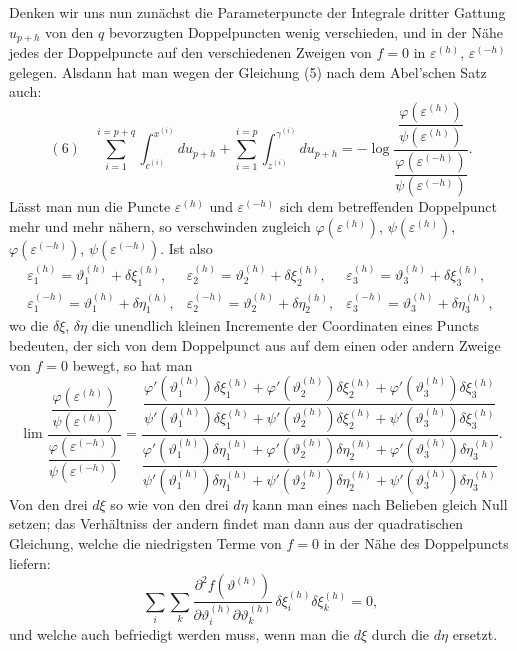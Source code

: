 \documentclass[10pt]{article}
\begin{document}
Denken wir uns nun zunächst die Parameterpuncte der Integrale dritter Gattung \(u_{p+h}\) von den \(q\) bevorzugten Doppelpuncten wenig verschieden, und in der Nähe jedes der Doppelpuncte auf den verschiedenen Zweigen von \(f=0\) in \(\varepsilon^{(h)}\), \(\varepsilon^{(-h)}\) gelegen. Alsdann hat man wegen der Gleichung (5) nach dem Abel'schen Satz auch:
\[
(6)\quad
\sum_{i=1}^{i=p+q}\int_{c^{(i)}}^{x^{(i)}}du_{p+h}
+\sum_{i=1}^{i=p}\int_{z^{(i)}}^{\gamma^{(i)}}du_{p+h}
=-\log
\frac{\dfrac{\varphi(\varepsilon^{(h)})}{\psi(\varepsilon^{(h)})}}
{\dfrac{\varphi(\varepsilon^{(-h)})}{\psi(\varepsilon^{(-h)})}}.
\]
Lässt man nun die Puncte \(\varepsilon^{(h)}\) und \(\varepsilon^{(-h)}\) sich dem betreffenden Doppelpunct mehr und mehr nähern, so verschwinden zugleich \(\varphi(\varepsilon^{(h)})\), \(\psi(\varepsilon^{(h)})\), \(\varphi(\varepsilon^{(-h)})\), \(\psi(\varepsilon^{(-h)})\). Ist also
\[
\begin{array}{lll}
\varepsilon_1^{(h)}=\vartheta_1^{(h)}+\delta\xi_1^{(h)},&
\varepsilon_2^{(h)}=\vartheta_2^{(h)}+\delta\xi_2^{(h)},&
\varepsilon_3^{(h)}=\vartheta_3^{(h)}+\delta\xi_3^{(h)},\\
\varepsilon_1^{(-h)}=\vartheta_1^{(h)}+\delta\eta_1^{(h)},&
\varepsilon_2^{(-h)}=\vartheta_2^{(h)}+\delta\eta_2^{(h)},&
\varepsilon_3^{(-h)}=\vartheta_3^{(h)}+\delta\eta_3^{(h)},
\end{array}
\]
wo die \(\delta\xi\), \(\delta\eta\) die unendlich kleinen Incremente der Coordinaten eines Puncts bedeuten, der sich von dem Doppelpunct aus auf dem einen oder andern Zweige von \(f=0\) bewegt, so hat man
\[
\lim
\frac{\dfrac{\varphi(\varepsilon^{(h)})}{\psi(\varepsilon^{(h)})}}
{\dfrac{\varphi(\varepsilon^{(-h)})}{\psi(\varepsilon^{(-h)})}}
=
\frac{\dfrac{\varphi'(\vartheta_1^{(h)})\delta\xi_1^{(h)}+\varphi'(\vartheta_2^{(h)})\delta\xi_2^{(h)}+\varphi'(\vartheta_3^{(h)})\delta\xi_3^{(h)}}
{\psi'(\vartheta_1^{(h)})\delta\xi_1^{(h)}+\psi'(\vartheta_2^{(h)})\delta\xi_2^{(h)}+\psi'(\vartheta_3^{(h)})\delta\xi_3^{(h)}}}
{\dfrac{\varphi'(\vartheta_1^{(h)})\delta\eta_1^{(h)}+\varphi'(\vartheta_2^{(h)})\delta\eta_2^{(h)}+\varphi'(\vartheta_3^{(h)})\delta\eta_3^{(h)}}
{\psi'(\vartheta_1^{(h)})\delta\eta_1^{(h)}+\psi'(\vartheta_2^{(h)})\delta\eta_2^{(h)}+\psi'(\vartheta_3^{(h)})\delta\eta_3^{(h)}}}.
\]
Von den drei \(d\xi\) so wie von den drei \(d\eta\) kann man eines nach Belieben gleich Null setzen; das Verhältniss der andern findet man dann aus der quadratischen Gleichung, welche die niedrigsten Terme von \(f=0\) in der Nähe des Doppelpuncts liefern:
\[
\sum_i\sum_k
\frac{\partial^2f(\vartheta^{(h)})}{\partial\vartheta_i^{(h)}\partial\vartheta_k^{(h)}}
\,\delta\xi_i^{(h)}\delta\xi_k^{(h)}=0,
\]
und welche auch befriedigt werden muss, wenn man die \(d\xi\) durch die \(d\eta\) ersetzt.
\end{document}
